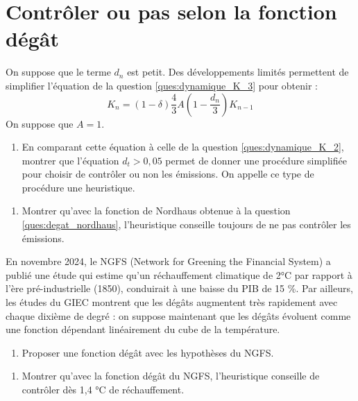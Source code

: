\documentclass[12pt]{article}
\newcommand{\ques}[1]{\begin{enumerate}[resume]
\item  #1
\end{enumerate}}
\newcommand{\rep}[1]{\textit{Réponse :} #1 \\}
\renewcommand{\rep}[1]{ }
\theoremstyle{remark}
\begin{document}
\section{Contrôler ou pas selon la fonction dégât}

On suppose que le terme $d_n$ est petit. Des développements limités permettent de simplifier l'équation de la question \ref{ques:dynamique_K_3} pour obtenir :
\begin{equation*} 
K_n=(1- \delta)\frac{4}{3}A(1-\frac{d_n}{3}) K_{n-1}\end{equation*}
On suppose que $A=1$.
\ques{En comparant cette équation à celle de la question \ref{ques:dynamique_K_2}, montrer que l'équation $d_t>0,05$ permet de donner une procédure simplifiée pour choisir de contrôler ou non les émissions.
On appelle ce type de procédure une heuristique.}
\rep{On choisit de contrôler les émissions lorsque le facteur multiplicatif du scénario contrôlé est supérieur au scénario non contrôlé :
\begin{equation*}
(1-\delta)\frac{4}{3}(1-\frac{d_n}{3}) <\frac{1-\delta}{1-0,2373A}
\end{equation*}
\begin{equation*}
1-\frac{d_n}{3} <\frac{3}{4}\times \frac{1}{0,7627}
\end{equation*}
\begin{equation*}
0,05=3-\frac{9}{4 \times 0,7627} < d_n
\end{equation*}
}


\ques{Montrer qu'avec la fonction de Nordhaus obtenue à la question \ref{ques:degat_nordhaus}, l'heuristique conseille toujours de ne pas contrôler les émissions.}
\rep{Lecture graphique ou calculer $3\times \sqrt{0,05/0,0133}=5,8$ °C.}

En novembre 2024, le NGFS (Network for Greening the Financial System) a publié une étude qui estime qu'un réchauffement climatique de 2°C par rapport à l'ère pré-industrielle (1850), conduirait à une baisse du PIB de 15 \%. Par ailleurs, les études du GIEC montrent que les dégâts augmentent très rapidement avec chaque dixième de degré : on suppose maintenant que les dégâts évoluent comme une fonction dépendant linéairement du cube de la température.
\ques{Proposer une fonction dégât avec les hypothèses du NGFS.}
\rep{\begin{equation*} d_n = 0,15 (\frac{T_n}{2})^3\end{equation*}}

\ques{Montrer qu'avec la fonction dégât du NGFS, l'heuristique conseille de contrôler dès 1,4 °C de réchauffement.}
\rep{Lecture graphique ou calculer $2\times (0,05/0,15)^{1/3}=1,39$ °C.}
\end{document}

